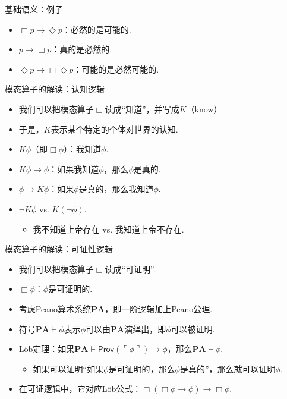     {基础语义：例子}
    \begin{itemize}
        \item $\Box p\to\Diamond p$：必然的是可能的.
        \item $p\to\Box p$：真的是必然的.
        \item $\Diamond p\to\Box\Diamond p$：可能的是必然可能的.
    \end{itemize}
    
    {模态算子的解读：认知逻辑}
    \begin{itemize}
        \item 我们可以把模态算子$\Box$读成“知道”，并写成$K$（know）.
        \item 于是，$K$表示某个特定的个体对世界的认知.
        \item $K\phi$（即$\Box\phi$）：我知道$\phi$.
        \item $K\phi\to\phi$：如果我知道$\phi$，那么$\phi$是真的.
        \item $\phi\to K\phi$：如果$\phi$是真的，那么我知道$\phi$.
        \item $\neg K\phi$ vs. $K(\neg\phi)$.
        \begin{itemize}
            \item 我不知道上帝存在 vs. 我知道上帝不存在.
        \end{itemize}
    \end{itemize}
    
    \newcommand{\PA}{\mathbf{PA}}
    {模态算子的解读：可证性逻辑}
    \begin{itemize}
        \item 我们可以把模态算子$\Box$读成“可证明”.
        \item $\Box\phi$：$\phi$是可证明的.
        \item 考虑Peano算术系统$\PA$，即一阶逻辑加上Peano公理.
        \item 符号$\PA\vdash \phi$表示$\phi$可以由$\PA$演绎出，即$\phi$可以被证明.
        \item Löb定理：如果$\PA\vdash\mathsf{Prov}(\ulcorner\phi\urcorner)\to\phi$，那么$\PA\vdash\phi$.
        \begin{itemize}
            \item 如果可以证明“如果$\phi$是可证明的，那么$\phi$是真的”，那么就可以证明$\phi$.
        \end{itemize}
        \item 在可证逻辑中，它对应Löb公式：$\Box(\Box\phi\to\phi)\to\Box\phi$.
    \end{itemize}
    
